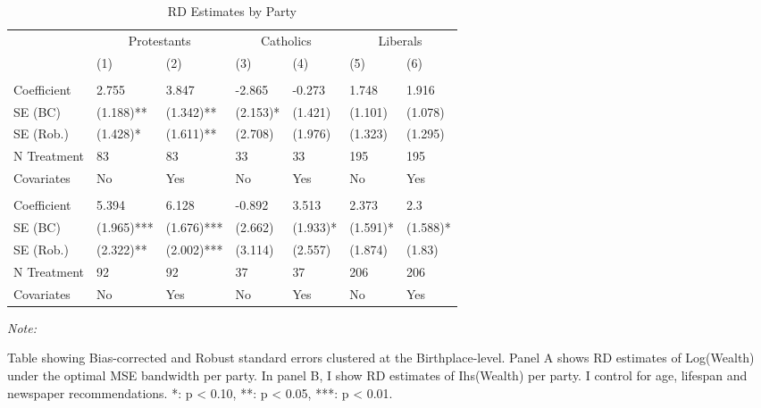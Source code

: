 \begin{table}[!h]

\caption{\label{tab:results_per_party}RD Estimates by Party}
\centering
\fontsize{10}{12}\selectfont
\begin{threeparttable}
\begin{tabular}[t]{lllllll}
\toprule
\multicolumn{1}{c}{ } & \multicolumn{2}{c}{Protestants} & \multicolumn{2}{c}{Catholics} & \multicolumn{2}{c}{Liberals} \\
\cmidrule(l{3pt}r{3pt}){2-3} \cmidrule(l{3pt}r{3pt}){4-5} \cmidrule(l{3pt}r{3pt}){6-7}
  & (1) & (2) & (3) & (4) & (5) & (6)\\
\midrule
\addlinespace[0.3em]
\multicolumn{7}{l}{\textbf{Panel A: Log(Wealth)}}\\
\hspace{1em}Coefficient & 2.755 & 3.847 & -2.865 & -0.273 & 1.748 & 1.916\\
\hspace{1em}SE (BC) & (1.188)** & (1.342)** & (2.153)* & (1.421) & (1.101) & (1.078)\\
\hspace{1em}SE (Rob.) & (1.428)* & (1.611)** & (2.708) & (1.976) & (1.323) & (1.295)\\
\hspace{1em}N Treatment & 83 & 83 & 33 & 33 & 195 & 195\\
\hspace{1em}Covariates & No & Yes & No & Yes & No & \vphantom{1} Yes\\
\addlinespace[0.3em]
\multicolumn{7}{l}{\textbf{Panel B: Ihs(Wealth)}}\\
\hspace{1em}Coefficient & 5.394 & 6.128 & -0.892 & 3.513 & 2.373 & 2.3\\
\hspace{1em}SE (BC) & (1.965)*** & (1.676)*** & (2.662) & (1.933)* & (1.591)* & (1.588)*\\
\hspace{1em}SE (Rob.) & (2.322)** & (2.002)*** & (3.114) & (2.557) & (1.874) & (1.83)\\
\hspace{1em}N Treatment & 92 & 92 & 37 & 37 & 206 & 206\\
\hspace{1em}Covariates & No & Yes & No & Yes & No & Yes\\
\bottomrule
\end{tabular}
\begin{tablenotes}[para]
\item \textit{Note: } 
\item Table showing Bias-corrected and Robust standard errors clustered at the Birthplace-level. Panel A shows RD estimates of Log(Wealth) under the optimal MSE bandwidth per party. In panel B, I  show RD estimates of Ihs(Wealth) per party. I control for age, lifespan and newspaper recommendations. *: p < 0.10, **: p < 0.05, ***: p < 0.01.
\end{tablenotes}
\end{threeparttable}
\end{table}
